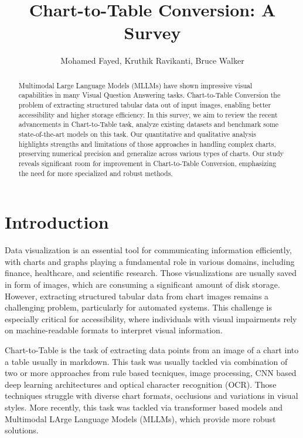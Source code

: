 \documentclass[
	letterpaper, %
]{jdf}
\author{Mohamed Fayed, Kruthik Ravikanti, Bruce Walker}
\title{Chart-to-Table Conversion: A Survey}
\begin{document}

\maketitle

\begin{abstract}
  Multimodal   Large Language Models (MLLMs) have shown impressive visual capabilities in many Visual Question Answering tasks.
    Chart-to-Table Conversion the problem of extracting structured tabular data out of input images, enabling better accessibility and higher storage efficiency.
In this survey, we aim to review the recent advancements in Chart-to-Table task, analyze existing datasets and benchmark some state-of-the-art models on this task.
Our quantitative and qualitative analysis highlights strengths and limitations of those approaches in handling complex charts, preserving numerical precision and generalize across various types of charts.
Our study reveals significant room for improvement in Chart-to-Table Conversion, emphasizing the need for more specialized and robust methods.
   \end{abstract}


\section{Introduction}\label{sect:intro}
Data visualization is an essential tool for communicating information efficiently, with charts and graphs playing a fundamental role in various domains, including finance, healthcare, and scientific research.
Those visualizations are usually saved in form of images, which are consuming a significant amount of disk storage.
However, extracting structured tabular data from chart images remains a challenging problem, particularly for automated systems.
This challenge is especially critical for accessibility, where individuals with visual impairments rely on machine-readable formats to interpret visual information.

Chart-to-Table is the task of extracting data points from an image of a chart into a table usually in markdown\cite{liu2022deplot,masry2024chartgemma}.
This task was usually tackled via combination of two or more approaches from rule based tecniques, image processing, CNN based deep learning architectures and optical character recognition (OCR).
Those techniques struggle with diverse chart formats, occlusions and variations in visual styles.
More recently, this task was tackled via transformer based models and Multimodal LArge Language Models (MLLMs), which provide more robust solutions.
\end{document}

